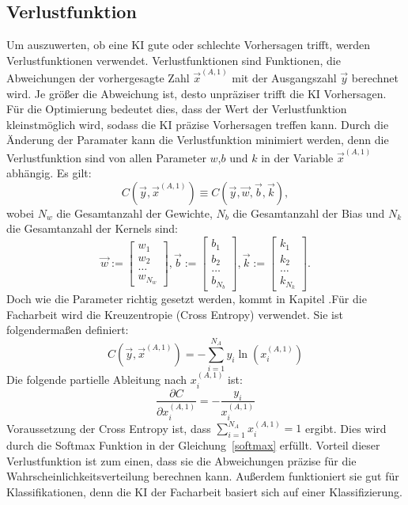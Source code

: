 \documentclass[11pt]{article}
\begin{document}
\subsection{Verlustfunktion}\label{lost}
Um auszuwerten, ob eine KI gute oder schlechte Vorhersagen trifft, werden Verlustfunktionen verwendet. Verlustfunktionen sind Funktionen, die Abweichungen
der vorhergesagte Zahl $\vec{x}^{(A,1)}$ mit der Ausgangszahl $\vec{y}$ berechnet wird. Je größer die Abweichung ist, desto unpräziser trifft die KI Vorhersagen. Für die
Optimierung bedeutet dies, dass der Wert der Verlustfunktion kleinstmöglich wird, sodass die KI präzise Vorhersagen treffen kann. Durch die Änderung der Paramater
kann die Verlustfunktion minimiert werden, denn die Verlustfunktion sind von allen Parameter $w$,$b$ und $k$ in der Variable $\vec{x}^{(A,1)}$ abhängig.
Es gilt:
\begin{equation}
    C(\vec{y},\vec{x}^{(A,1)}) \equiv C(\vec{y},\vec{w},\vec{b},\vec{k}),
\end{equation}
 wobei $N_w$ die Gesamtanzahl der Gewichte, $N_b$ die Gesamtanzahl der Bias und $N_k$ die Gesamtanzahl der Kernels sind:
\begin{equation}
    \vec{w} := \begin{bmatrix} w_{1} \\ w_{2} \\ \ldots \\ w_{N_w} \end{bmatrix},
    \vec{b} := \begin{bmatrix} b_{1} \\ b_{2} \\ \ldots \\ b_{N_b} \end{bmatrix},
    \vec{k} := \begin{bmatrix} k_{1} \\ k_{2} \\ \ldots \\ k_{N_k} \end{bmatrix}.
\end{equation}
Doch wie die Parameter richtig gesetzt werden, kommt in Kapitel
.\@ Für die Facharbeit wird die Kreuzentropie (Cross Entropy) verwendet. Sie ist folgendermaßen definiert:
\begin{equation}
    C(\vec{y},\vec{x}^{(A,1)}) = -\sum_{i=1}^{N_A} y_i \ln(x_i^{(A,1)})
\end{equation}
Die folgende partielle Ableitung nach $x_i^{(A,1)}$ ist:
\begin{equation}
    \frac{\partial C}{\partial x_i^{(A,1)}} = -\frac{y_i}{x_i^{(A,1)}}
\end{equation}
Voraussetzung der Cross Entropy ist, dass $\sum_{i=1}^{N_A} x_i^{(A,1)} = 1$ ergibt. Dies wird durch die Softmax Funktion in der Gleichung~\ref{softmax} erfüllt.
Vorteil dieser Verlustfunktion ist zum einen, dass sie die Abweichungen präzise für die Wahrscheinlichkeitsverteilung berechnen kann. Außerdem funktioniert
sie gut für Klassifikationen, denn die KI der Facharbeit basiert sich auf einer Klassifizierung. 
\end{document}
